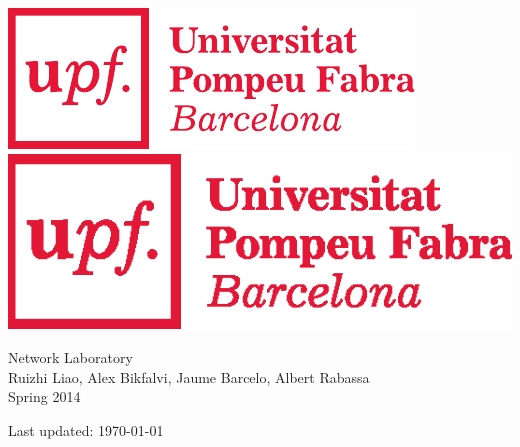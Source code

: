 \begin{titlepage}
\begin{center}

\ifpdf
\includegraphics[width=0.3\linewidth]{Figures/Logo.pdf}\\[9cm]
\else
\includegraphics[width=0.3\linewidth]{Figures/Logo.eps}\\[9cm]
\fi

\textsf{\Huge Network Laboratory}\\[1cm]

\textsf{Ruizhi Liao, Alex Bikfalvi, Jaume Barcelo, Albert Rabassa}\\[1cm]

\textsf{Spring 2014}

\vfill

\textsf{Last updated: \today}

\end{center}
\end{titlepage} 
